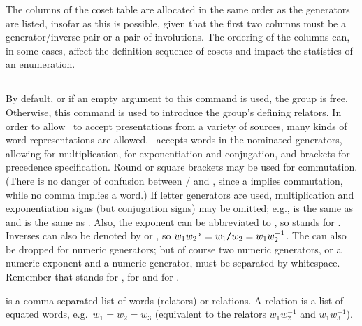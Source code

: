 The columns of the coset table are allocated in the same order as the 
  generators are listed, insofar as this is possible, given that the first
  two columns must be a generator/inverse pair or a pair of involutions.
The ordering of the columns can, in some cases, affect the definition
  sequence of cosets and impact the statistics of an enumeration.

\subsection{}
  \label{sec:grouprel}

By default, or if an empty argument to this command is used, the group
  is free.
Otherwise, this command is used to introduce the group's defining
  relators.
In order to allow \ace\ to accept presentations from a variety of
  sources, many kinds of word representations are allowed. 
\ace\ accepts words in the nominated generators, allowing \ttt{*} for
  multiplication, \ttt{\^{}} for exponentiation and conjugation, and
  brackets for precedence specification. 
Round or square brackets may be used for commutation. 
(There is no danger of confusion between \ttt{[a,b]}/ and
  , since a \ttt{,} implies commutation, while no comma implies a
  word.)
If letter generators are used, multiplication and exponentiation signs
  (but  conjugation signs) may be omitted; e.g.,  is the
  same as  and  is the same as .
Also, the exponent  can be abbreviated to \ttt{-},
  so  stands for .
Inverses can also be denoted by  or \ttt{/}, so
  $w_1w_2\texttt{'} = w_1\texttt{/}w_2 = w_1w^{-1}_2$\kern-1.5pt.
The \ttt{*} can also be dropped for numeric generators; but of course two
  numeric generators, or a numeric exponent and a numeric generator, must
  be separated by whitespace. 
Remember that  stands for ,  for
   and \ttt{[a,b]} \amp \ttt{[a,b,c]} for  \amp
  \ttt{[[a,b],c]}.

 is a comma-separated list of words (relators)
  or relations.
A relation is a list of equated words, e.g.~$w_1=w_2=w_3$ (equivalent to
  the relators $w_1w^{-1}_2$ and $w_1w^{-1}_3$).

\subsection{}

